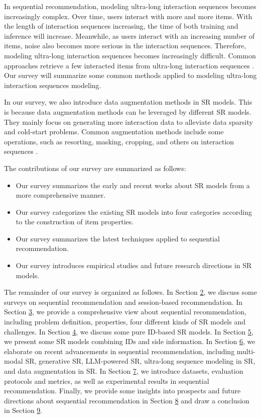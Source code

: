 \documentclass[review]{fcs}
\begin{document}
	In sequential recommendation, modeling ultra-long interaction sequences becomes increasingly complex. Over time, users interact with more and more items. With the length of interaction sequences increasing, the time of both training and inference will increase. Meanwhile, as users interact with an increasing number of items, noise also becomes more serious in the interaction sequences. Therefore, modeling ultra-long interaction sequences becomes increasingly difficult. Common approaches retrieve a few interacted items from ultra-long interaction sequences \cite{SIM}. Our survey will summarize some common methods applied to modeling ultra-long interaction sequences modeling.
	
	In our survey, we also introduce data augmentation methods in SR models. This is because data augmentation methods can be leveraged by different SR models. They mainly focus on generating more interaction data to alleviate data sparsity and cold-start problems. Common augmentation methods include some operations, such as resorting, masking, cropping, and others on interaction sequences \cite{CL4SRec}.
	
	The contributions of our survey are summarized as follows:
	\begin{itemize}[left=0pt]
		\item Our survey summarizes the early and recent works about SR models from a more comprehensive manner.
		\item Our survey categorizes the existing SR models into four categories according to the construction of item properties.
		\item Our survey summarizes the latest techniques applied to sequential recommendation.
		\item Our survey introduces empirical studies and future research directions in SR models.
	\end{itemize}

	The remainder of our survey is organized as follows. In Section \hyperref[sec:related_surveys]{2}, we discuss some surveys on sequential recommendation and session-based recommendation. In Section \hyperref[sec:sequential_recommendation]{3}, we provide a comprehensive view about sequential recommendation, including problem definition, properties, four different kinds of SR models and challenges. In Section \hyperref[sec:pure_ID_based_SR]{4}, we discuss some pure ID-based SR models. In Section \hyperref[sec:SR_with_side_information]{5}, we present some SR models combining IDs and side information. In Section \hyperref[sec:recent_SR_advancements]{6}, we elaborate on recent advancements in sequential recommendation, including multi-modal SR, generative SR, LLM-powered SR, ultra-long sequence modeling in SR, and data augmentation in SR. In Section \hyperref[sec:empirical_studies]{7}, we introduce datasets, evaluation protocols and metrics, as well as experimental results in sequential recommendation. Finally, we provide some insights into prospects and future directions about sequential recommendation in Section \hyperref[sec:prospects_and_future_directions]{8} and draw a conclusion in Section \hyperref[sec:conclusions]{9}.
\end{document}
